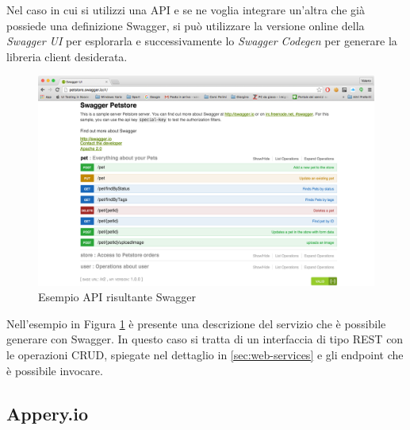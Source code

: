 Nel caso in cui si utilizzi una API e se ne voglia integrare un'altra che già possiede una definizione Swagger, si può utilizzare la versione online della \emph{Swagger UI} per esplorarla e successivamente lo \emph{Swagger Codegen} per generare la libreria client desiderata.

\begin{figure}[ht]
	\centering
	\includegraphics[width=\textwidth]{2-nozioni-preliminari/Immagini/swagger-petstore.png}
	\caption{Esempio API risultante Swagger}\label{fig:swagger-petstore}
\end{figure}

Nell'esempio in Figura \ref{fig:swagger-petstore} è presente una descrizione del servizio che è possibile generare con Swagger. In questo caso si tratta di un interfaccia di tipo REST con le operazioni CRUD, spiegate nel dettaglio in \ref{sec:web-services} e gli endpoint che è possibile invocare.
\subsection*{Appery.io}

